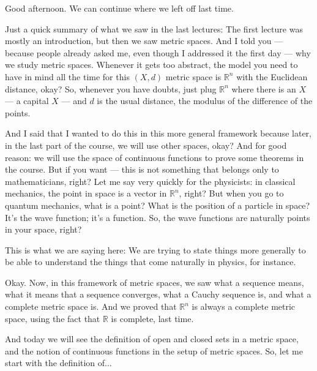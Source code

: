 \begin{speech}[00:00:00 - 00:01:50]
Good afternoon. We can continue where we left off last time.

Just a quick summary of what we saw in the last lectures: The first lecture was mostly an introduction, but then we saw metric spaces. And I told you --- because people already asked me, even though I addressed it the first day --- why we study metric spaces. Whenever it gets too abstract, the model you need to have in mind all the time for this $(X, d)$ metric space is $\mathbb{R}^n$ with the Euclidean distance, okay? So, whenever you have doubts, just plug $\mathbb{R}^n$ where there is an $X$ --- a capital $X$ --- and $d$ is the usual distance, the modulus of the difference of the points.

And I said that I wanted to do this in this more general framework because later, in the last part of the course, we will use other spaces, okay? And for good reason: we will use the space of continuous functions to prove some theorems in the course. But if you want --- this is not something that belongs only to mathematicians, right? Let me say very quickly for the physicists: in classical mechanics, the point in space is a vector in $\mathbb{R}^n$, right? But when you go to quantum mechanics, what is a point? What is the position of a particle in space? It's the wave function; it's a function. So, the wave functions are naturally points in your space, right?

This is what we are saying here: We are trying to state things more generally to be able to understand the things that come naturally in physics, for instance.
\end{speech}

\begin{speech}[00:01:50 - 00:02:24]
Okay. Now, in this framework of metric spaces, we saw what a sequence means, what it means that a sequence converges, what a Cauchy sequence is, and what a complete metric space is. And we proved that $\mathbb{R}^n$ is always a complete metric space, using the fact that $\mathbb{R}$ is complete, last time.

And today we will see the definition of open and closed sets in a metric space, and the notion of continuous functions in the setup of metric spaces. So, let me start with the definition of...
\end{speech}

